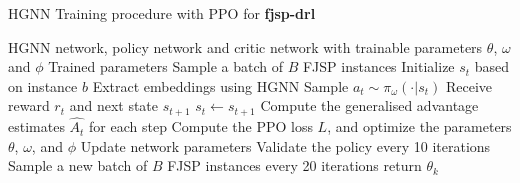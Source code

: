 \begin{algorithm}
	\caption{HGNN Training procedure with PPO for \textbf{fjsp-drl}} \label{algorithm:hgnnppo}
	\begin{algorithmic}[1]
	\renewcommand{\algorithmicrequire}{\hspace*{\algorithmicindent}  \textbf{Input:}}
	\renewcommand{\algorithmicensure}{\hspace*{\algorithmicindent}  \textbf{Output:}}
	\Require HGNN network, policy network and critic network with trainable parameters $\theta$, $\omega$ and $\phi$
	\Ensure Trained parameters
	\State Sample a batch of $B$ FJSP instances
		  
			\State Initialize $s_t$ based on instance $b$
                \State Extract embeddings using HGNN
                \State Sample $a_t \sim \pi_\omega(\cdot | s_t)$
                \State Receive reward $r_t$ and next state $s_{t+1}$
                \State $s_t \gets s_{t+1}$
            \EndWhile
			\State Compute the generalised advantage estimates $\hat{A_t}$ for each step
        \State Compute  the PPO loss $L$, and optimize the parameters $\theta$, $\omega$, and $\phi$
        \State Update network parameters
        \State Validate the policy every 10 iterations
        \State Sample a new batch of $B$ FJSP instances every 20 iterations
		\EndFor
	\EndFor
	\State return $\theta_k$
\end{algorithmic}
\end{algorithm}